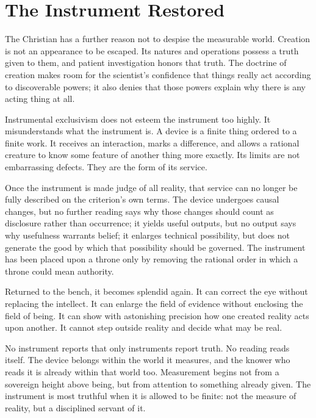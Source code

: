 \section{The Instrument Restored}

The Christian has a further reason not to despise the measurable world. Creation is not an appearance to be escaped. Its natures and operations possess a truth given to them, and patient investigation honors that truth. The doctrine of creation makes room for the scientist's confidence that things really act according to discoverable powers; it also denies that those powers explain why there is any acting thing at all.

Instrumental exclusivism does not esteem the instrument too highly. It misunderstands what the instrument is. A device is a finite thing ordered to a finite work. It receives an interaction, marks a difference, and allows a rational creature to know some feature of another thing more exactly. Its limits are not embarrassing defects. They are the form of its service.

Once the instrument is made judge of all reality, that service can no longer be fully described on the criterion's own terms. The device undergoes causal changes, but no further reading says why those changes should count as disclosure rather than occurrence; it yields useful outputs, but no output says why usefulness warrants belief; it enlarges technical possibility, but does not generate the good by which that possibility should be governed. The instrument has been placed upon a throne only by removing the rational order in which a throne could mean authority.

Returned to the bench, it becomes splendid again. It can correct the eye without replacing the intellect. It can enlarge the field of evidence without enclosing the field of being. It can show with astonishing precision how one created reality acts upon another. It cannot step outside reality and decide what may be real.

No instrument reports that only instruments report truth. No reading reads itself. The device belongs within the world it measures, and the knower who reads it is already within that world too. Measurement begins not from a sovereign height above being, but from attention to something already given. The instrument is most truthful when it is allowed to be finite: not the measure of reality, but a disciplined servant of it.
